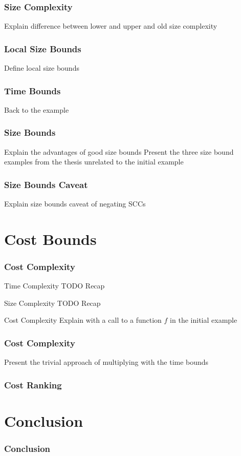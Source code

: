 \documentclass{beamer}
\begin{document}
\begin{frame}
  \frametitle{Size Complexity}
  Explain difference between lower and upper and old size complexity
\end{frame}

\begin{frame}
  \frametitle{Local Size Bounds}
  Define local size bounds
\end{frame}

\begin{frame}
  \frametitle{Time Bounds}
  Back to the example
\end{frame}

\begin{frame}
  \frametitle{Size Bounds}
  Explain the advantages of good size bounds
  Present the three size bound examples from the thesis unrelated to the initial example
\end{frame}

\begin{frame}
  \frametitle{Size Bounds Caveat}
  Explain size bounds caveat of negating SCCs
\end{frame}

\section{Cost Bounds}

\begin{frame}
  \frametitle{Cost Complexity}
  \begin{block}{Time Complexity}
    TODO Recap
  \end{block}
  \pause
  \begin{block}{Size Complexity}
    TODO Recap
  \end{block}
  \pause
  \begin{block}{Cost Complexity}
    Explain with a call to a function $f$ in the initial example 
  \end{block}
\end{frame}

\begin{frame}
  \frametitle{Cost Complexity}
  Present the trivial approach of multiplying with the time bounds
\end{frame}

\begin{frame}
  \frametitle{Cost Ranking}
\end{frame}

\section{Conclusion}

\begin{frame}
  \frametitle{Conclusion}
\end{frame}
\end{document}
